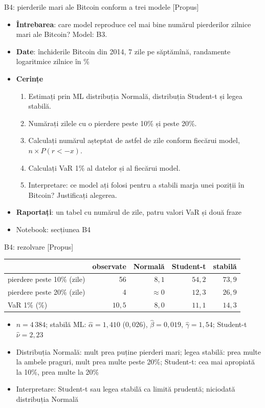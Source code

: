 \begin{frame}{B4: pierderile mari ale Bitcoin conform a trei modele [Propus]}
\itemsize{\scriptsize}
\begin{itemize}
\item \textbf{Întrebarea}: care model reproduce cel mai bine numărul pierderilor zilnice mari ale Bitcoin? Model: B3.
\item \textbf{Date}: închiderile Bitcoin din 2014, 7 zile pe săptămînă, randamente logaritmice zilnice în \%
\item \textbf{Cerințe}
\begin{enumerate}
    \item Estimați prin ML distribuția Normală, distribuția Student-t și legea stabilă.
    \item Numărați zilele cu o pierdere peste 10\% și peste 20\%.
    \item Calculați numărul așteptat de astfel de zile conform fiecărui model, $n \times P(r < -x)$.
    \item Calculați VaR 1\% al datelor și al fiecărui model.
    \item Interpretare: ce model ați folosi pentru a stabili marja unei poziții în Bitcoin? Justificați alegerea.
\end{enumerate}
\item \textbf{Raportați}: un tabel cu numărul de zile, patru valori VaR și două fraze
\item Notebook: secțiunea B4
\end{itemize}
\end{frame}

\ifsolutions
\begin{frame}{B4: rezolvare [Propus]}
\itemsize{\footnotesize}
\begin{center}
\footnotesize
\begin{tabular}{lrrrr}
\toprule
& observate & Normală & Student-t & stabilă \\
\midrule
pierdere peste 10\% (zile) & 56 & $8{,}1$ & $54{,}2$ & $73{,}9$ \\
pierdere peste 20\% (zile) & 4 & $\approx 0$ & $12{,}3$ & $26{,}9$ \\
VaR 1\% (\%) & $10{,}5$ & $8{,}0$ & $11{,}1$ & $14{,}3$ \\
\bottomrule
\end{tabular}
\end{center}
\begin{itemize}
    \item $n = 4\,384$; stabilă ML: $\hat\alpha = 1{,}410$ ($0{,}026$), $\hat\beta = 0{,}019$, $\hat\gamma = 1{,}54$; Student-t $\hat\nu = 2{,}23$
    \item Distribuția Normală: mult prea puține pierderi mari; legea stabilă: prea multe la ambele praguri, mult prea multe peste 20\%; Student-t: cea mai apropiată la 10\%, prea multe la 20\%
    \item Interpretare: Student-t sau legea stabilă ca limită prudentă; niciodată distribuția Normală
\end{itemize}
\end{frame}
\fi

